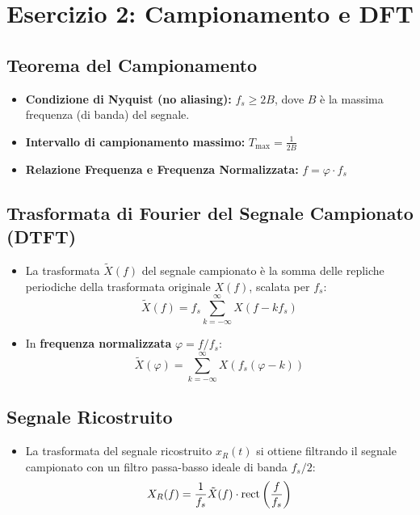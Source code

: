 \chapter{Esercizio 2: Campionamento e DFT}

\section{Teorema del Campionamento}
\begin{itemize}
    \item \textbf{Condizione di Nyquist (no aliasing):} $f_s \ge 2B$, dove $B$ è la massima frequenza (di banda) del segnale.
    \item \textbf{Intervallo di campionamento massimo:} $T_{\max} = \frac{1}{2B}$
    \item \textbf{Relazione Frequenza e Frequenza Normalizzata:} $f = \varphi \cdot f_s$
\end{itemize}

\section{Trasformata di Fourier del Segnale Campionato (DTFT)}
\begin{itemize}
    \item La trasformata $\tilde{X}(f)$ del segnale campionato è la somma delle repliche periodiche della trasformata originale $X(f)$, scalata per $f_s$:
    \[
        \tilde{X}(f) = f_s \sum_{k=-\infty}^{\infty} X(f - k f_s)
    \]
    \item In \textbf{frequenza normalizzata} $\varphi = f/f_s$:
    \[
        \tilde{X}(\varphi) = \sum_{k=-\infty}^{\infty} X(f_s(\varphi - k))
    \]
\end{itemize}

\section{Segnale Ricostruito}
\begin{itemize}
    \item La trasformata del segnale ricostruito $x_R(t)$ si ottiene filtrando il segnale campionato con un filtro passa-basso ideale di banda $f_s/2$:
    \[
        X_R(f) = \frac{1}{f_s} \tilde{X}(f) \cdot \text{rect}\left(\frac{f}{f_s}\right)
    \]
\end{itemize}

